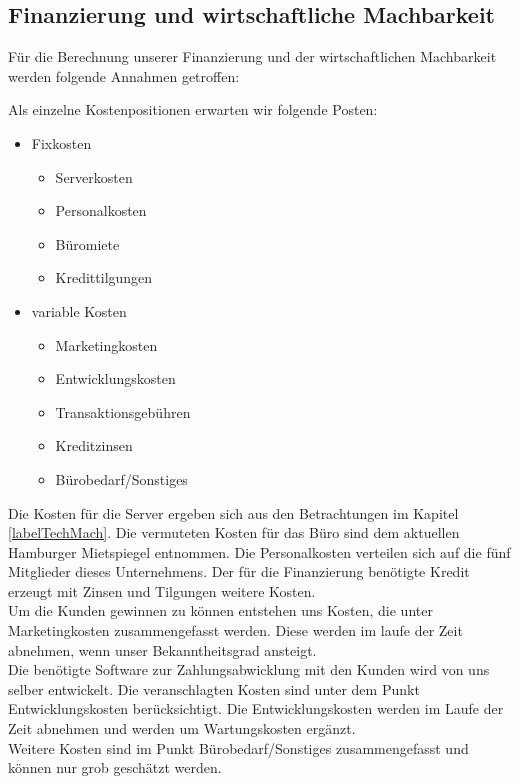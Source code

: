 \subsection{Finanzierung und wirtschaftliche Machbarkeit}\label{labelWirtMach}

Für die Berechnung unserer Finanzierung und der wirtschaftlichen Machbarkeit werden folgende Annahmen getroffen:

Als einzelne Kostenpositionen erwarten wir folgende Posten:
\begin{itemize}
\item Fixkosten
 \begin{itemize}
\item Serverkosten
\item Personalkosten
\item Büromiete
\item Kredittilgungen
 \end{itemize}
\item variable Kosten
\begin{itemize}
\item Marketingkosten
\item Entwicklungskosten
\item Transaktionsgebühren
\item Kreditzinsen
\item Bürobedarf/Sonstiges
\end{itemize}
\end{itemize}

Die Kosten für die Server ergeben sich aus den Betrachtungen im Kapitel \ref{labelTechMach}. Die vermuteten Kosten für das Büro sind dem aktuellen Hamburger Mietspiegel entnommen. Die Personalkosten verteilen sich auf die fünf Mitglieder dieses Unternehmens. Der für die Finanzierung benötigte Kredit erzeugt mit Zinsen und Tilgungen weitere Kosten.\\
Um die Kunden gewinnen zu können entstehen uns Kosten, die unter Marketingkosten zusammengefasst werden. Diese werden im laufe der Zeit abnehmen, wenn unser Bekanntheitsgrad ansteigt.\\
Die benötigte Software zur Zahlungsabwicklung mit den Kunden wird von uns selber entwickelt. Die veranschlagten Kosten sind unter dem Punkt Entwicklungskosten berücksichtigt. Die Entwicklungskosten werden im Laufe der Zeit abnehmen und werden um Wartungskosten ergänzt.\\
Weitere Kosten sind im Punkt Bürobedarf/Sonstiges zusammengefasst und können nur grob geschätzt werden.

